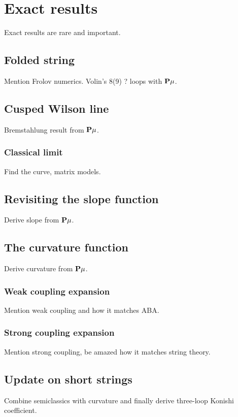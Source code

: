 
\section{Exact results}

Exact results are rare and important.

\subsection{Folded string}

Mention Frolov numerics. Volin's 8(9) ? loops with ${\bf P}\mu$.

\subsection{Cusped Wilson line}

Bremstahlung result from ${\bf P}\mu$.

\subsubsection{Classical limit}

Find the curve, matrix models.

\subsection{Revisiting the slope function}

Derive slope from ${\bf P}\mu$.

\subsection{The curvature function}

Derive curvature from ${\bf P}\mu$.

\subsubsection{Weak coupling expansion}

Mention weak coupling and how it matches ABA.

\subsubsection{Strong coupling expansion}

Mention strong coupling, be amazed how it matches string theory.

\subsection{Update on short strings}

Combine semiclassics with curvature and finally derive three-loop Konishi coefficient.
